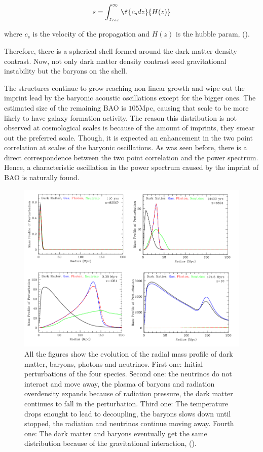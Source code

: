 \documentclass[a4,useAMS,usegraphicx,12pt]{article}
\begin{document}
\[  
s = \int_{z_{rec}}^{\infty} \f{c_s dz}{H(z)}
\]


where $c_s$ is the velocity of the propagation and $H(z)$ is the hubble param, (\cite{pilar}). 

Therefore, there is a spherical shell formed 
around the dark matter density contrast. Now, not only dark matter density contrast seed gravitational instability but 
the baryons on the shell. 

The structures continue to grow reaching non linear growth and wipe out the imprint lead by the baryonic acoustic
oscillations except for the bigger ones. The estimated size of the remaining BAO is $105$Mpc, causing that scale to 
be more likely to have galaxy formation activity. The reason this distribution is not observed at cosmological scales is because
of the amount of imprints, they smear out the preferred scale. Though, it is expected an enhancement in the two point
correlation at scales of the baryonic oscillations. As was seen before, there is a direct correspondence between the 
two point correlation and the power spectrum. Hence, a characteristic oscillation in the power spectrum caused by the imprint of BAO 
is naturally found. 	

 
\begin{figure}[htbp]
       \centering
               \includegraphics[width=1.0\textwidth]{Images/BAOS2.png}
       \caption{\small All the figures show the evolution of the radial mass profile of dark matter,  baryons, photons
       and neutrinos. First one: Initial perturbations of the four species. 
       Second one: the neutrinos do not interact and move away, 
       the plasma of baryons and radiation overdensity expands because of radiation pressure, the dark matter
       continues to fall in the perturbation. Third one: The temperature drops enought to lead to decoupling, 
      the baryons slows down until stopped, the radiation and neutrinos continue moving away. Fourth one:  
      The dark matter and baryons eventually get the same distribution because of the gravitational interaction, (\cite{10MPC}).}
       \label{DBM}
 \end{figure}
\end{document}
